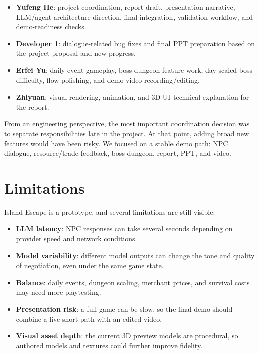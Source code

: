 \documentclass[11pt]{article}
\begin{document}
\begin{itemize}
  \item \textbf{Yufeng He}: project coordination, report draft, presentation
  narrative, LLM/agent architecture direction, final integration, validation
  workflow, and demo-readiness checks.
  \item \textbf{Developer 1}: dialogue-related bug fixes and final PPT
  preparation based on the project proposal and new progress.
  \item \textbf{Erfei Yu}: daily event gameplay, boss dungeon feature work,
  day-scaled boss difficulty, flow polishing, and demo video recording/editing.
  \item \textbf{Zhiyuan}: visual rendering, animation, and 3D UI technical
  explanation for the report.
\end{itemize}

From an engineering perspective, the most important coordination decision was to
separate responsibilities late in the project. At that point, adding broad new
features would have been risky. We focused on a stable demo path: NPC dialogue,
resource/trade feedback, boss dungeon, report, PPT, and video.

\section{Limitations}

Island Escape is a prototype, and several limitations are still visible:

\begin{itemize}
  \item \textbf{LLM latency}: NPC responses can take several seconds depending
  on provider speed and network conditions.
  \item \textbf{Model variability}: different model outputs can change the tone
  and quality of negotiation, even under the same game state.
  \item \textbf{Balance}: daily events, dungeon scaling, merchant prices, and
  survival costs may need more playtesting.
  \item \textbf{Presentation risk}: a full game can be slow, so the final demo
  should combine a live short path with an edited video.
  \item \textbf{Visual asset depth}: the current 3D preview models are
  procedural, so authored models and textures could further improve fidelity.
\end{itemize}
\end{document}
